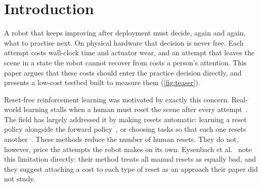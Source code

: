 \documentclass[runningheads]{llncs}
\begin{document}
\begin{abstract}
When a robot practises without human resets, every attempt still costs wall-clock time, actuator wear, and sometimes a person's attention, yet the schedulers that decide what to practise next treat attempts as free. We present an open, low-cost testbed for measuring these costs: a self-built SO-101 arm runs two demonstration-trained ACT policies that reset each other, with a vision-based success detector and a ledger that records the time, joint travel, and human interventions of every attempt. We formulate cost-aware practice scheduling, in which task selection is rewarded by measured competence gain net of embodied cost, and specify in advance the comparison that will test it. Its first two conditions, run on hardware for 51 minutes of robot time, show that a fixed retry limit did not reduce the share of execution time lost to failures (36\%, against 27\% for a feasibility rule; not significant) and doubled interventions per success. The logs explain why: failures did not cluster, so a retry right after a failure was as likely to succeed as any other attempt, and early requests for help bought nothing. We also report lessons from building the system, including a coverage effect in which concentrating demonstrations in a smaller workspace raised success there from 8/20 to 10/10.


\medskip\noindent\textbf{Code, data, logs and videos:} \url{https://github.com/Vedant2604/so101-cost-aware-scheduler}
\end{abstract}



\section{Introduction}
\label{sec:intro}

A robot that keeps improving after deployment must decide, again and again, what to practise next. On physical hardware that decision is never free. Each attempt costs wall-clock time and actuator wear, and an attempt that leaves the scene in a state the robot cannot recover from costs a person's attention. This paper argues that these costs should enter the practice decision directly, and presents a low-cost testbed built to measure them (\cref{fig:teaser}).

Reset-free reinforcement learning was motivated by exactly this concern. Real-world learning stalls when a human must reset the scene after every attempt~\cite{eysenbach2018,zhu2020}. The field has largely addressed it by making resets automatic: learning a reset policy alongside the forward policy~\cite{eysenbach2018}, or choosing tasks so that each one resets another~\cite{gupta2021}. These methods reduce the number of human resets. They do not, however, price the attempts the robot makes on its own. Eysenbach et al.~\cite{eysenbach2018} note this limitation directly: their method treats all manual resets as equally bad, and they suggest attaching a cost to each type of reset as an approach their paper did not study.
\end{document}
